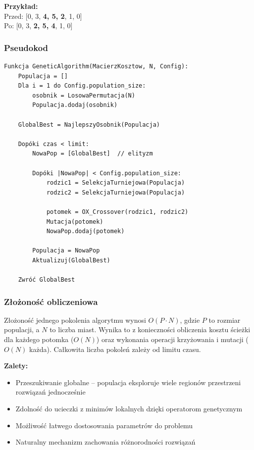 \documentclass[a4paper,12pt]{article}
\begin{document}
\textbf{Przykład:}\\
Przed: [0, 3, \textbf{4, 5, 2}, 1, 0]\\
Po:    [0, 3, \textbf{2, 5, 4}, 1, 0]

\subsubsection{Pseudokod}

\begin{verbatim}
Funkcja GeneticAlgorithm(MacierzKosztow, N, Config):
    Populacja = []
    Dla i = 1 do Config.population_size:
        osobnik = LosowaPermutacja(N)
        Populacja.dodaj(osobnik)
    
    GlobalBest = NajlepszyOsobnik(Populacja)
    
    Dopóki czas < limit:
        NowaPop = [GlobalBest]  // elityzm
        
        Dopóki |NowaPop| < Config.population_size:
            rodzic1 = SelekcjaTurniejowa(Populacja)
            rodzic2 = SelekcjaTurniejowa(Populacja)
            
            potomek = OX_Crossover(rodzic1, rodzic2)
            Mutacja(potomek)
            NowaPop.dodaj(potomek)
        
        Populacja = NowaPop
        Aktualizuj(GlobalBest)
    
    Zwróć GlobalBest
\end{verbatim}

\subsubsection{Złożoność obliczeniowa}

Złożoność jednego pokolenia algorytmu wynosi $O(P \cdot N)$, gdzie $P$ to rozmiar populacji, a $N$ to liczba miast.
Wynika to z konieczności obliczenia kosztu ścieżki dla każdego potomka ($O(N)$) oraz wykonania operacji
krzyżowania i mutacji ($O(N)$ każda). Całkowita liczba pokoleń zależy od limitu czasu.

\textbf{Zalety:}
\begin{itemize}
    \item Przeszukiwanie globalne -- populacja eksploruje wiele regionów przestrzeni rozwiązań jednocześnie
    \item Zdolność do ucieczki z minimów lokalnych dzięki operatorom genetycznym
    \item Możliwość łatwego dostosowania parametrów do problemu
    \item Naturalny mechanizm zachowania różnorodności rozwiązań
\end{itemize}
\end{document}
